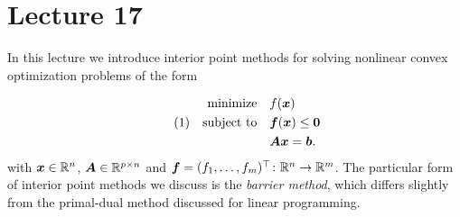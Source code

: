 %
%
% 


\chapter*{Lecture 17}
\setcounter{chapter}{17}
\setcounter{section}{0}
\setcounter{equation}{0}
\setcounter{theorem}{0}


In this lecture we introduce interior point methods for solving nonlinear convex optimization problems of the form

\begin{align}\label{eq:constr}\tag{1}
\begin{split}
 \text{minimize}\quad & f(\bm{x})\\
 \quad\text{subject to}\quad & \bm{f}(\bm{x})\leq \bm{0}\\
         & \bm{A}\bm{x} = \bm{b}.
\end{split}
\end{align}
with $\bm{x}\in \mathbb{R}^n$, $\bm{A}\in \mathbb{R}^{p\times n}$ and $\bm{f}=(f_1,\dots,f_m)^{\top}\colon \mathbb{R}^n\to \mathbb{R}^m$. The particular form of interior point methods we discuss is the {\em barrier method}, which differs slightly from the primal-dual method discussed for linear programming.

